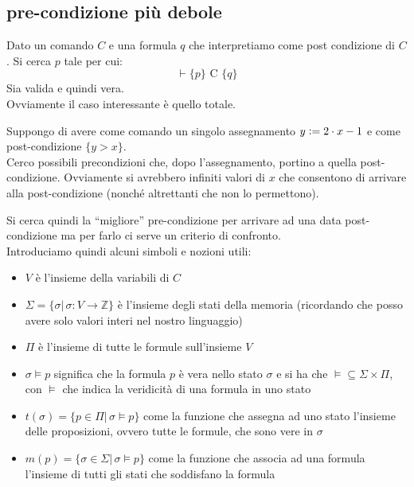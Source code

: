 				      				\subsection{pre-condizione più debole}
				      				Dato un comando $C$ e una formula $q$ che interpretiamo come post condizione di
				      				$C$. Si cerca $p$ tale per cui:
				      				\[\vdash\{p\}\mbox{ C } \{q\}\]
				      				Sia valida e quindi vera.\\
				      				Ovviamente il caso interessante è quello totale.
				      				\begin{esempio}
				      					Suppongo di avere come comando un singolo assegnamento $y\cceq 2\cdot x-1$ e
				      					come post-condizione $\{y>x\}$.\\
				      					Cerco possibili precondizioni che, dopo l'assegnamento, portino a quella
				      					post-condizione. Ovviamente si avrebbero infiniti valori di $x$ che consentono
				      					di arrivare alla post-condizione (nonché altrettanti che non lo permettono). 
				      				\end{esempio}
				      				Si cerca quindi la ``migliore'' pre-condizione per arrivare ad una data
				      				post-condizione ma per farlo ci serve un criterio di confronto. \\
				      				Introduciamo quindi alcuni simboli e nozioni utili:
				      				\begin{itemize}
				      					\item $V$ è l'insieme della variabili di $C$
				      					\item $\Sigma=\{\sigma|\,\sigma:V\to\mathbb{Z}\}$ è l'insieme degli stati
				      					      della memoria (ricordando che posso avere solo valori interi nel nostro
				      					      linguaggio)
				      					\item $\Pi$ è l'insieme di tutte le formule sull'insieme $V$
				      					\item $\sigma \vDash p$ significa che la formula $p$ è vera nello stato
				      					      $\sigma$ e si ha che $\vDash\subseteq\Sigma\times \Pi$, con $\vDash$ che
				      					      indica la veridicità di una formula in uno stato
				      					\item $t(\sigma)=\{p\in \Pi|\,\sigma\vDash p\}$ come la funzione che assegna
				      					      ad uno stato l'insieme delle proposizioni, ovvero tutte le formule, che sono
				      					      vere in $\sigma$
				      					\item $m(p)=\{\sigma\in \Sigma|\,\sigma\vDash p\}$ come la funzione che
				      					      associa ad una formula l'insieme di tutti gli stati che soddisfano la formula
				      				\end{itemize}
